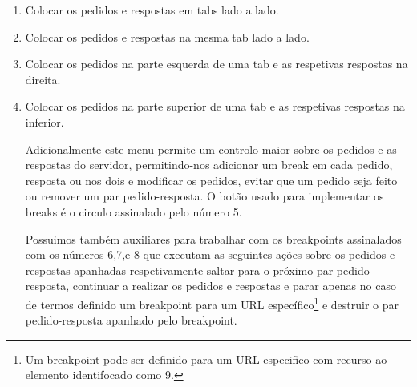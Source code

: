 \begin{enumerate}

\item Colocar os pedidos e respostas em tabs lado a lado.
\item Colocar os pedidos e respostas na mesma tab lado a lado.
\item Colocar os pedidos na parte esquerda de uma tab e as respetivas respostas na direita.
\item Colocar os pedidos na parte superior de uma tab e as respetivas respostas na inferior.

\par Adicionalmente este menu permite um controlo maior sobre os pedidos e as respostas do servidor, permitindo-nos adicionar um break em cada pedido, resposta ou nos dois e modificar os pedidos, evitar que um pedido seja feito ou remover um par pedido-resposta. O botão usado para implementar os breaks é  o circulo assinalado pelo número 5.\newline

\par Possuimos também auxiliares para trabalhar com os breakpoints assinalados com os números 6,7,e 8 que executam as seguintes ações sobre os pedidos e respostas apanhadas respetivamente saltar para o próximo par pedido resposta, continuar a realizar os pedidos e respostas e parar apenas no caso de termos definido um breakpoint para um URL específico\footnote[4]{Um breakpoint pode ser definido para um URL especifico com recurso ao elemento identifocado como 9.} e destruir o par pedido-resposta apanhado pelo breakpoint. \newline
\end{enumerate}

